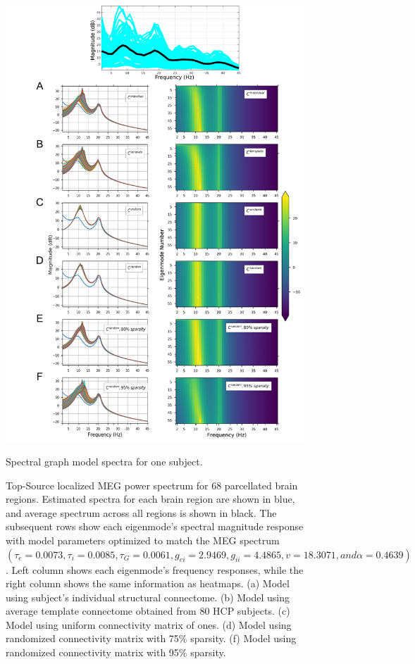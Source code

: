 \begin{figure}[htbp]
    \centering
    \includegraphics[scale=0.81]{../figures/chapter5/fig2_conn_spectra.png}
    \caption{Spectral graph model spectra for one subject.}
    \caption*{Top-Source localized MEG power spectrum for 68 parcellated brain regions. Estimated spectra for each brain region are shown in blue, and average spectrum across all regions is shown in black. The subsequent rows show each eigenmode's spectral magnitude response with model parameters optimized to match the MEG spectrum $(\tau_e = 0.0073, \tau_i = 0.0085, \tau_G = 0.0061, g_{ei} = 2.9469, g_{ii} = 4.4865, v = 18.3071, and \alpha = 0.4639)$. Left column shows each eigenmode's frequency responses, while the right column shows the same information as heatmaps. (a) Model using  subject's individual structural connectome. (b) Model using average template connectome obtained from 80 HCP subjects. (c) Model using uniform connectivity matrix of ones. (d) Model using randomized connectivity matrix with 75\% sparsity. (f) Model using randomized connectivity matrix with 95\% sparsity.}
    \label{fig:conn_spectra}
\end{figure}

